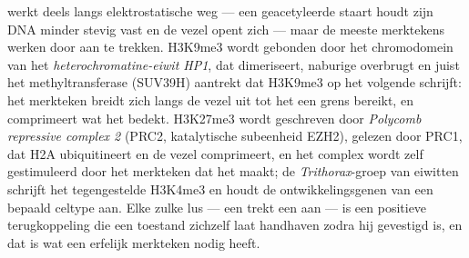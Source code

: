 \begin{proposition}\label{prop:b3:chromatin-epigenetics:readers}
 werkt deels langs elektrostatische weg --- een
geacetyleerde staart houdt zijn DNA minder stevig vast en de vezel
opent zich --- maar de meeste merktekens werken door  aan te
trekken. H3K9me3 wordt gebonden door het chromodomein van het
\emph{heterochromatine-eiwit HP1}, dat dimeriseert, naburige
 overbrugt en juist het methyltransferase (SUV39H)
aantrekt dat H3K9me3 op het volgende  schrijft: het
merkteken breidt zich langs de vezel uit tot het een grens bereikt, en
comprimeert wat het bedekt. H3K27me3 wordt geschreven door
\emph{Polycomb repressive complex 2} (PRC2, katalytische subeenheid
EZH2), gelezen door PRC1, dat H2A ubiquitineert en de vezel
comprimeert, en het complex wordt zelf gestimuleerd door het merkteken
dat het maakt; de \emph{Trithorax}-groep van eiwitten schrijft het
tegengestelde H3K4me3 en houdt de ontwikkelingsgenen van een bepaald
celtype aan. Elke zulke lus --- een  trekt een  aan --- is
een positieve terugkoppeling die een toestand zichzelf laat handhaven
zodra hij gevestigd is, en dat is wat een erfelijk merkteken nodig heeft.
\end{proposition}

